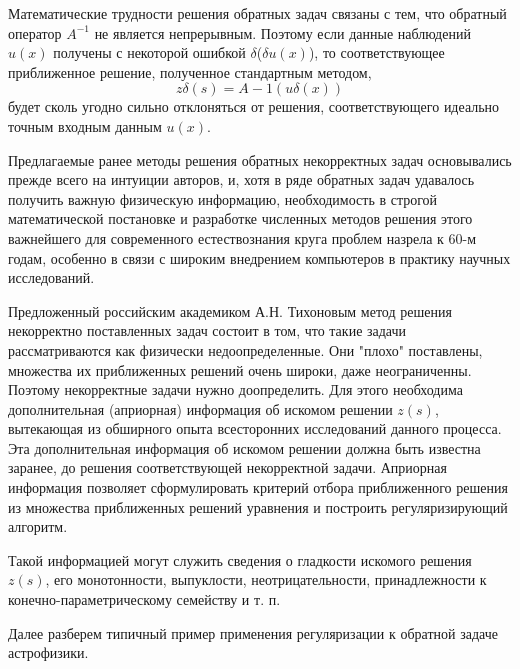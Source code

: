 \documentclass[12pt, a4paper]{article}
\begin{document}
	Математические трудности решения обратных задач связаны с тем, что обратный оператор $A^{-1}$ не является непрерывным. Поэтому если данные наблюдений $u(x)$ получены с некоторой ошибкой $\delta$($\delta u(x)$), то соответствующее приближенное решение, полученное стандартным методом,
	$$
	z\delta(s)= A -1 (u\delta(x))
	$$
	будет сколь угодно сильно отклоняться от решения, соответствующего идеально точным входным данным $u(x)$.
	
	Предлагаемые ранее методы решения обратных некорректных задач основывались прежде всего на интуиции авторов, и, хотя в ряде обратных задач удавалось получить важную физическую информацию, необходимость в строгой математической постановке и разработке численных методов решения этого важнейшего для современного естествознания круга проблем назрела к 60-м годам, особенно в связи с широким внедрением компьютеров в практику научных исследований.

	Предложенный российским академиком А.Н. Тихоновым метод решения некорректно поставленных задач состоит в том, что такие задачи рассматриваются как физически недоопределенные. Они "плохо" поставлены, множества их приближенных решений очень широки, даже неограниченны. Поэтому некорректные задачи нужно доопределить. Для этого необходима дополнительная (априорная) информация об искомом решении $z(s)$, вытекающая из обширного опыта всесторонних исследований данного процесса. Эта дополнительная информация об искомом решении должна быть известна заранее, до решения соответствующей некорректной задачи. Априорная информация позволяет сформулировать критерий отбора приближенного решения из множества приближенных решений уравнения и построить регуляризирующий алгоритм.

	Такой информацией могут служить сведения о гладкости искомого решения $z(s)$, его монотонности, выпуклости, неотрицательности, принадлежности к конечно-параметрическому семейству и т. п.

	Далее разберем типичный пример применения регуляризации к обратной задаче астрофизики.
\end{document}
